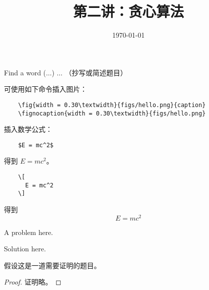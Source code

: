 \documentclass[11pt, a4paper, UTF8]{ctexart}
\title{第二讲：贪心算法}
\date{\today}     %
\begin{document}
\maketitle
\noplagiarism	%
\beginthishw	%

\begin{problem}[UD: 1.2]	%
  Find a word ($\ldots$) $\ldots$ （抄写或简述题目）
\end{problem}

\begin{remark}	%
 
\end{remark}

\begin{solution}
  可使用如下命令插入图片：
  \begin{verbatim}
    \fig{width = 0.30\textwidth}{figs/hello.png}{caption}
    \fignocaption{width = 0.30\textwidth}{figs/hello.png}
  \end{verbatim}
  插入数学公式：
  \begin{verbatim}
    $E = mc^2$
  \end{verbatim}
  得到 $E = mc^2$。
  \begin{verbatim}
    \[
      E = mc^2
    \]
  \end{verbatim}
  得到
  \[
    E = mc^2
  \]
\end{solution}

\begin{problem}[UD: 1.3]
  A problem here.
\end{problem}

\begin{solution}
  Solution here.
\end{solution}
\begin{problem}[UD: x.x]
  假设这是一道需要证明的题目。	
\end{problem}


\begin{proof}
  证明略。	
\end{proof}
\begincorrection	%
\end{document}
